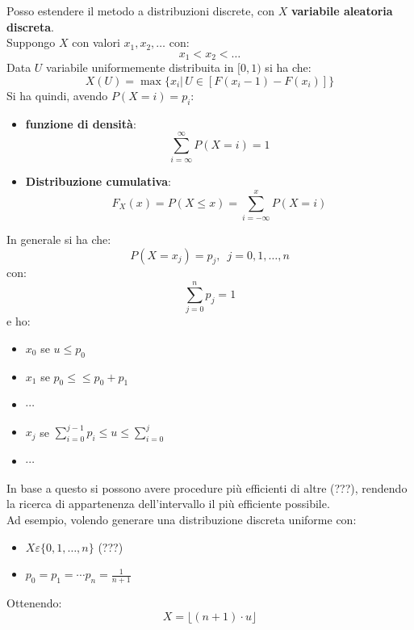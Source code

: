 \message{ !name(modprob.tex)}\documentclass[a4paper,12pt, oneside]{book}
\begin{document}
Posso estendere il metodo a distribuzioni discrete, con $X$ \textbf{variabile
  aleatoria discreta}. \\
Suppongo $X$ con valori $x_1,x_2,\ldots$ con:
\[x_1<x_2<\ldots\]
Data $U$ variabile uniformemente distribuita in $[0,1)$ si ha che:
\[X(U)=\max\{x_i|\,U\in[F(x_i-1)-F(x_i)]\}\]
Si ha quindi, avendo $P(X=i)=p_i$:
\begin{itemize}
  \item \textbf{funzione di densità}:
  \[\sum_{i=\infty}^\infty P(X=i)=1\]
  \item \textbf{Distribuzione cumulativa}:
  \[F_X(x)=P(X\leq x)=\sum_{i=-\infty}^xP(X=i)\]
\end{itemize}
In generale si ha che:
\[P(X=x_j)=p_j,\,\,\,j=0,1,\ldots, n\]
con:
\[\sum_{j=0}^np_j=1\]
e ho:
\begin{itemize}
  \item $x_0$ se $u\leq p_0$
  \item $x_1$ se $p_0\leq \leq p_0+p_1$
  \item $\cdots$
  \item $x_j$ se $\sum_{i=0}^{j-1} p_i\leq u\leq\sum_{i=0}^j$
  \item $\cdots$
\end{itemize}
In base a questo si possono avere procedure più efficienti di altre (???),
rendendo la ricerca di appartenenza dell'intervallo il più efficiente
possibile.\\
Ad esempio, volendo generare una distribuzione discreta uniforme con:
\begin{itemize}
  \item $X\varepsilon\{0,1,\ldots,n\}$ (???)
  \item $p_0=p_1=\cdots p_n=\frac{1}{n+1}$ 
\end{itemize}
Ottenendo:
\[X=\lfloor (n+1)\cdot u\rfloor\]
\end{document}
